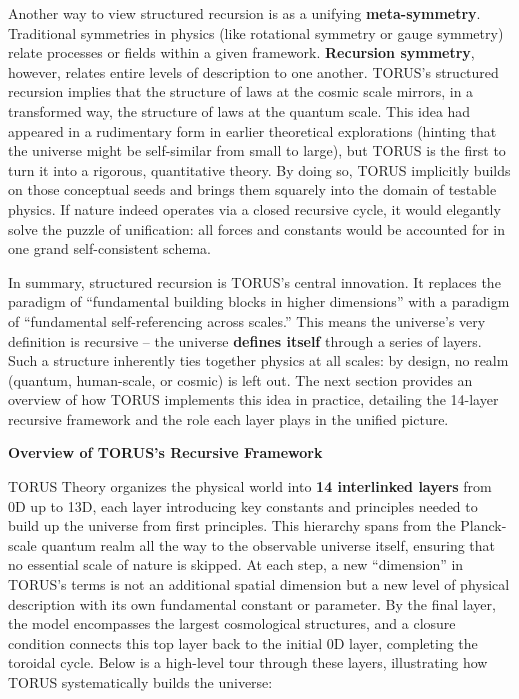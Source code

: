 \documentclass[]{article}
\begin{document}
Another way to view structured recursion is as a unifying
\textbf{meta-symmetry}. Traditional symmetries in physics (like
rotational symmetry or gauge symmetry) relate processes or fields within
a given framework. \textbf{Recursion symmetry}, however, relates entire
levels of description to one another. TORUS's structured recursion
implies that the structure of laws at the cosmic scale mirrors, in a
transformed way, the structure of laws at the quantum scale. This idea
had appeared in a rudimentary form in earlier theoretical explorations
(hinting that the universe might be self-similar from small to large),
but TORUS is the first to turn it into a rigorous, quantitative theory.
By doing so, TORUS implicitly builds on those conceptual seeds and
brings them squarely into the domain of testable physics. If nature
indeed operates via a closed recursive cycle, it would elegantly solve
the puzzle of unification: all forces and constants would be accounted
for in one grand self-consistent schema.

In summary, structured recursion is TORUS's central innovation. It
replaces the paradigm of ``fundamental building blocks in higher
dimensions'' with a paradigm of ``fundamental self-referencing across
scales.'' This means the universe's very definition is recursive -- the
universe \textbf{defines itself} through a series of layers. Such a
structure inherently ties together physics at all scales: by design, no
realm (quantum, human-scale, or cosmic) is left out. The next section
provides an overview of how TORUS implements this idea in practice,
detailing the 14-layer recursive framework and the role each layer plays
in the unified picture.

\textbf{Overview of TORUS's Recursive Framework}

TORUS Theory organizes the physical world into \textbf{14 interlinked
layers} from 0D up to 13D, each layer introducing key constants and
principles needed to build up the universe from first principles. This
hierarchy spans from the Planck-scale quantum realm all the way to the
observable universe itself, ensuring that no essential scale of nature
is skipped. At each step, a new ``dimension'' in TORUS's terms is not an
additional spatial dimension but a new level of physical description
with its own fundamental constant or parameter. By the final layer, the
model encompasses the largest cosmological structures, and a closure
condition connects this top layer back to the initial 0D layer,
completing the toroidal cycle. Below is a high-level tour through these
layers, illustrating how TORUS systematically builds the universe:
\end{document}
